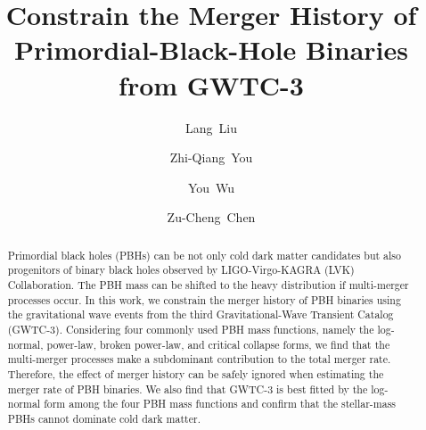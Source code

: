 \documentclass[
reprint,           %
superscriptaddress,%
amsmath,           %
amssymb,           %
aps,               %
prd,               %
notitlepage,       %
longbibliography,  %
floatfix,          %
nofootinbib,
]{revtex4-1}
\begin{document}
	
\title{Constrain the Merger History of Primordial-Black-Hole Binaries from GWTC-3}
	
\author{Lang~Liu}


\author{Zhi-Qiang~You}

\author{You~Wu}

\author{Zu-Cheng~Chen}

	
\begin{abstract}
Primordial black holes (PBHs) can be not only cold dark matter candidates but also progenitors of binary black holes observed by LIGO-Virgo-KAGRA (LVK) Collaboration. The PBH mass can be shifted to the heavy distribution if multi-merger processes occur. In this work, we constrain the merger history of PBH binaries using the gravitational wave events from the third Gravitational-Wave Transient Catalog (GWTC-3). Considering four commonly used PBH mass functions, namely the log-normal, power-law, broken power-law, and critical collapse forms, we find that the multi-merger processes make a subdominant contribution to the total merger rate. Therefore, the effect of merger history can be safely ignored when estimating the merger rate of PBH binaries. We also find that GWTC-3 is best fitted by the log-normal form among the four PBH mass functions and confirm that the stellar-mass PBHs cannot dominate cold dark matter.
\end{abstract}
	
\end{document}
